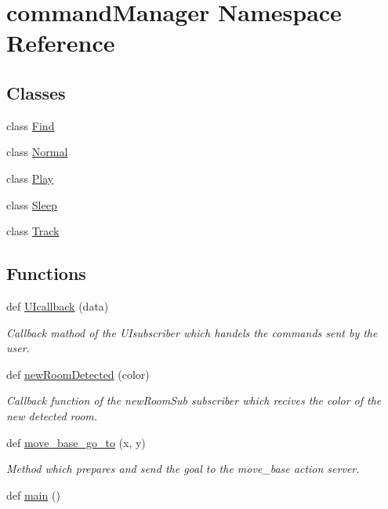 \hypertarget{namespacecommandManager}{}\section{command\+Manager Namespace Reference}
\label{namespacecommandManager}
\subsection*{Classes}
\begin{DoxyCompactItemize}
\item 
class \hyperlink{classcommandManager_1_1Find}{Find}
\item 
class \hyperlink{classcommandManager_1_1Normal}{Normal}
\item 
class \hyperlink{classcommandManager_1_1Play}{Play}
\item 
class \hyperlink{classcommandManager_1_1Sleep}{Sleep}
\item 
class \hyperlink{classcommandManager_1_1Track}{Track}
\end{DoxyCompactItemize}
\subsection*{Functions}
\begin{DoxyCompactItemize}
\item 
def \hyperlink{namespacecommandManager_a2310383d56755f0a09a75b1a92130e21}{U\+Icallback} (data)
\begin{DoxyCompactList}\small\item\em Callback mathod of the U\+Isubscriber which handels the commands sent by the user. \end{DoxyCompactList}\item 
def \hyperlink{namespacecommandManager_aa96fd2ed94c8c1168e09ced4015dcb1b}{new\+Room\+Detected} (color)
\begin{DoxyCompactList}\small\item\em Callback function of the new\+Room\+Sub subscriber which recives the color of the new detected room. \end{DoxyCompactList}\item 
def \hyperlink{namespacecommandManager_af8e54858c65310eb1e131529bf200516}{move\+\_\+base\+\_\+go\+\_\+to} (x, y)
\begin{DoxyCompactList}\small\item\em Method which prepares and send the goal to the move\+\_\+base action server. \end{DoxyCompactList}\item 
def \hyperlink{namespacecommandManager_ae8b570eb4bf393859bc74c9cb5fe125f}{main} ()
\end{DoxyCompactItemize}
